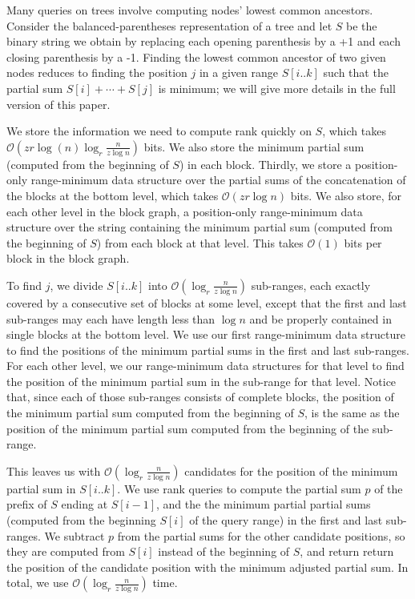 \documentclass[12pt]{article}
\newcommand{\Oh}[1]
  {\ensuremath{\mathcal{O}\!\left({#1}\right)}}
\begin{document}
Many queries on trees involve computing nodes' lowest common ancestors.  Consider the balanced-parentheses representation of a tree and let $S$ be the binary string we obtain by replacing each opening parenthesis by a +1 and each closing parenthesis by a -1.  Finding the lowest common ancestor of two given nodes reduces to finding the position $j$ in a given range \(S [i..k]\) such that the partial sum \(S [i] + \cdots + S [j]\) is minimum; we will give more details in the full version of this paper. 

We store the information we need to compute rank quickly on $S$, which takes $\Oh{zr \log (n) \log_r \frac{n}{z\log n}}$ bits.
We also store the minimum partial sum (computed from the beginning of $S$) in each block.  Thirdly, we store a position-only range-minimum data structure over the partial sums of the concatenation of the blocks at the bottom level, which takes $\Oh{z r \log n}$ bits.  We also store, for each other level in the block graph, a position-only range-minimum data structure over the string containing the minimum partial sum (computed from the beginning of $S$) from each block at that level.  This takes $\Oh{1}$ bits per block in the block graph.

To find $j$, we divide \(S [i..k]\) into $\Oh{\log_r \frac{n}{z\log n}}$ sub-ranges, each exactly covered by a consecutive set of blocks at some level, except that the first and last sub-ranges may each have length less than \(\log n\) and be properly contained in single blocks at the bottom level.  We use our first range-minimum data structure to find the positions of the minimum partial sums in the first and last sub-ranges.  For each other level, we our range-minimum data structures for that level to find the position of the minimum partial sum in the sub-range for that level.  Notice that, since each of those sub-ranges consists of complete blocks, the position of the minimum partial sum computed from the beginning of $S$, is the same as the position of the minimum partial sum computed from the beginning of the sub-range.

This leaves us with $\Oh{\log_r \frac{n}{z\log n}}$ candidates for the position of the minimum partial sum in \(S [i..k]\).  We use rank queries to compute the partial sum $p$ of the prefix of $S$ ending at \(S [i - 1]\), and the the minimum partial partial sums (computed from the beginning $S [i]$ of the query range) in the first and last sub-ranges.  We subtract $p$ from the partial sums for the other candidate positions, so they are computed from $S [i]$ instead of the beginning of $S$, and return return the position of the candidate position with the minimum adjusted partial sum.  In total, we use $\Oh{\log_r \frac{n}{z\log n}}$ time.
\end{document}
